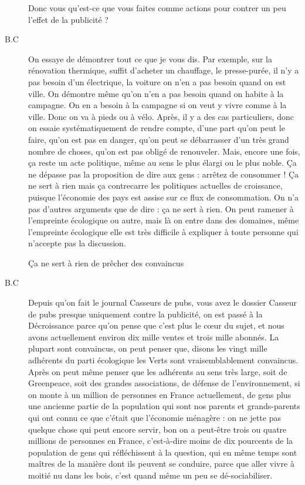 \begin{description}
Donc vous qu'est-ce que vous faites comme actions pour contrer un peu l'effet de la publicité ?

\vspace{1\baselineskip}

\item[B.C]On essaye de démontrer tout ce que je vous dis. Par exemple, sur la rénovation thermique, suffit d'acheter un chauffage, le presse-purée, il n'y a pas besoin d'un électrique, la voiture on n'en a pas besoin quand on est ville. On démontre même qu’on n’en a pas besoin quand on habite à la campagne.  On en a besoin à la campagne si on veut y vivre comme à la ville. Donc on va à pieds ou à vélo. Après, il y a des cas particuliers, donc on essaie systématiquement de rendre compte, d'une part qu'on peut le faire, qu'on est pas en danger, qu'on peut se débarrasser d'un très grand nombre de choses, qu'on est pas obligé de renouveler. Mais, encore une fois, ça reste un acte politique, même au sens le plus élargi ou le plus noble. Ça ne dépasse pas la proposition de dire aux gens : arrêtez de consommer ! Ça ne sert à rien mais ça contrecarre les politiques actuelles de croissance, puisque l'économie des pays est assise sur ce flux de consommation. On n’a pas d'autres arguments que de dire : ça ne sert à rien. On peut ramener à l'empreinte écologique ou autre, mais là on entre dans des domaines, même l'empreinte écologique elle est très difficile à expliquer à toute personne qui n'accepte pas la discussion.

\vspace{1\baselineskip}

Ça ne sert à rien de prêcher des convaincus

\vspace{1\baselineskip}

\item[B.C]Depuis qu'on fait le journal Casseurs de pubs, vous avez le dossier Casseur de pubs presque uniquement contre la publicité, on est passé à la Décroissance parce qu'on pense que c'est plus le cœur du sujet, et nous avons actuellement environ dix mille ventes et trois mille abonnés. La plupart sont convaincus, on peut penser que, disons les vingt mille adhérents du parti écologique les Verts sont vraisemblablement convaincus. Après on peut même penser que les adhérents au sens très large, soit de Greenpeace, soit des grandes associations, de défense de l'environnement, si on monte à un million de personnes en France actuellement, de gens plus une ancienne partie de la population qui sont nos parents et grands-parents qui ont connu ce que c'était que l'économie ménagère : on ne jette pas quelque chose qui peut encore servir, bon on a peut-être trois ou quatre millions de personnes en France, c'est-à-dire moins de dix pourcents de la population de gens qui réfléchissent à la question, qui en même temps sont maîtres de la manière dont ils peuvent se conduire, parce que aller vivre à moitié nu dans les bois, c'est quand même un peu se dé-sociabiliser. 


\end{description}
